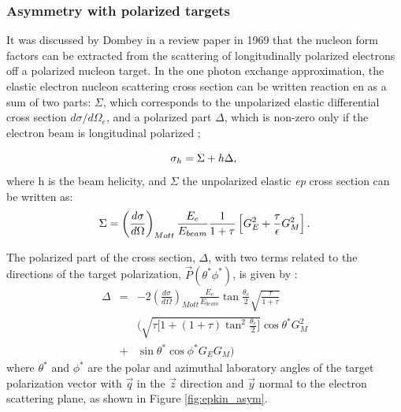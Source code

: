 \subsubsection{Asymmetry with polarized targets}
\label{subsubsec:Asymmetry}


It was discussed by Dombey \cite{dombey} in a review paper in 1969 that the nucleon form factors 
can be extracted from the scattering of longitudinally polarized electrons off
a polarized nucleon target. 
In the one photon exchange approximation, the elastic electron nucleon
scattering cross section can be written reaction en as a sum of two parts: $\Sigma$, which corresponds to
the unpolarized elastic differential cross section $d\sigma/d\Omega_e$, and a polarized part $\Delta$, which is
non-zero only if the electron beam is longitudinal polarized \cite{donnelly,raskin};

\begin{equation} 
\sigma_{h} = \Sigma + h \Delta, \\
\label{eq:asymm}
\end{equation}
\noindent
where h is the beam helicity, and $\Sigma$ the unpolarized elastic {\it {ep}} cross section can be written as:
\begin{equation} 
\Sigma =  \left(\frac{d\sigma}{d\Omega}\right)_{Mott}{\frac{E_e}{E_{beam}}}{\frac{1}{1+\tau}}\left[G_E^2 + \frac{\tau}{\epsilon}G_M^2 \right]. \\
\label{eq:Sigma}
\end{equation}

The polarized part of the cross section, $\Delta$, with two terms related to the directions of the target polarization, 
$\vec{P}(\theta^{\ast} \phi^{\ast})$, is given by \cite{donnelly,raskin}: 
\begin{eqnarray}
\Delta & = & -2 \left(\frac{d\sigma}{d\Omega}\right)_{Mott} \frac{E_e}{E_{beam}}\tan\frac{\theta_e}{2} \sqrt{\frac{\tau}{1+\tau}} \nonumber \\
& & \Big(\sqrt{\tau\big[1+(1+\tau)\tan^2\frac{\theta_e}{2}\big]} \cos\theta^{\ast}G_M^2  \nonumber \\
&+&\sin\theta^{\ast}\cos\phi^{\ast}G_E G_M  \Big)
\label{eq:delta}
\end{eqnarray}
\noindent
where $\theta^{\ast}$ and $\phi^{\ast}$ are the polar and 
azimuthal laboratory angles of the target polarization vector with $\vec q$ in the $\vec z$
direction and $\vec y$ normal to the electron scattering plane, as shown 
in Figure \ref{fig:epkin_asym}.

